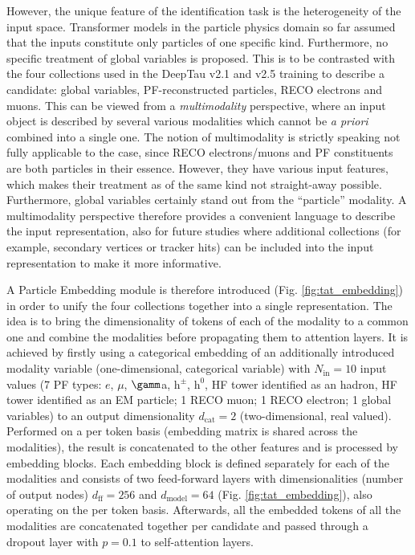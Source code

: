 However, the unique feature of the \tauh identification task is the heterogeneity of the input space. Transformer models in the particle physics domain so far assumed that the inputs constitute only particles of one specific kind. Furthermore, no specific treatment of global variables is proposed. This is to be contrasted with the four collections used in the DeepTau v2.1 and v2.5 training to describe a \tauh candidate: global variables, PF-reconstructed particles, RECO electrons and muons. This can be viewed from a \textit{multimodality} perspective, where an input object is described by several various modalities which cannot be \textit{a priori} combined into a single one. The notion of multimodality is strictly speaking not fully applicable to the \tauh case, since RECO electrons/muons and PF constituents are both particles in their essence. However, they have various input features, which makes their treatment as of the same kind not straight-away possible. Furthermore, global variables certainly stand out from the \enquote{particle} modality. A multimodality perspective therefore provides a convenient language to describe the input \tauh representation, also for future studies where additional collections (for example, secondary vertices or tracker hits) can be included into the input representation to make it more informative.  

A Particle Embedding module is therefore introduced (Fig. \ref{fig:tat_embedding}) in order to unify the four collections together into a single representation. The idea is to bring the dimensionality of tokens of each of the modality to a common one and combine the modalities before propagating them to attention layers. It is achieved by firstly using a categorical embedding of an additionally introduced modality variable (one-dimensional, categorical variable) with $N_\text{in}=10$ input values (7 PF types: $e$, $\mu$, $\gamm$a, $\text{h}^\pm$, $\text{h}^0$, HF tower identified as an hadron, HF tower identified as an EM particle; 1 RECO muon; 1 RECO electron; 1 global variables) to an output dimensionality $d_\text{cat}=2$ (two-dimensional, real valued). Performed on a per token basis (embedding matrix is shared across the modalities), the result is concatenated to the other features and is processed by embedding blocks. Each embedding block is defined separately for each of the modalities and consists of two feed-forward layers with dimensionalities (number of output nodes) $d_\text{ff}=256$ and $d_\text{model}=64$ (Fig. \ref{fig:tat_embedding}), also operating on the per token basis. Afterwards, all the embedded tokens of all the modalities are concatenated together per \tauh candidate and passed through a dropout layer \cite{JMLR:v15:srivastava14a} with $p=0.1$ to self-attention layers.

